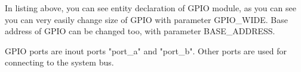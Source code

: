 In listing above, you can see entity declaration of GPIO module, as you can see
you can very easily change size of GPIO with parameter GPIO\_WIDE. Base address
of GPIO can be changed too, with parameter BASE\_ADDRESS.

GPIO ports are inout ports "port\_a" and "port\_b". Other ports are used for
connecting to the system bus.

